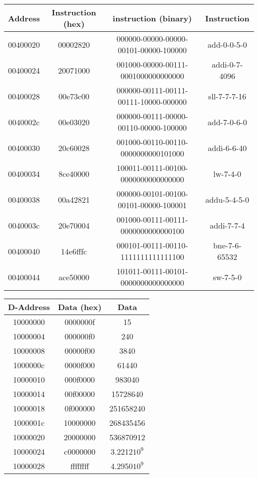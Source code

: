 \documentclass[11pt]{article}   	%
\begin{document}
\begin{table}[!htbp]

\begin{tabular}{|c|c|c|c|}
\hline
Address & Instruction (hex) & instruction (binary)  &  Instruction \\
\hline
00400020 & 00002820 & 000000-00000-00000-00101-00000-100000& add-0-0-5-0  \\
\hline
00400024 & 20071000 & 001000-00000-00111-0001000000000000 &addi-0-7-4096   \\
\hline
00400028 & 00e73c00 & 000000-00111-00111-00111-10000-000000 & sll-7-7-7-16  \\
\hline
0040002c & 00e03020 & 000000-00111-00000-00110-00000-100000 & add-7-0-6-0  \\
\hline
00400030 & 20c60028 & 001000-00110-00110-0000000000101000 & addi-6-6-40   \\
\hline
00400034 & 8ce40000 & 100011-00111-00100-0000000000000000 &lw-7-4-0    \\
\hline
00400038 & 00a42821 & 000000-00101-00100-00101-00000-100001 & addu-5-4-5-0 \\
\hline
0040003c & 20e70004 & 001000-00111-00111-0000000000000100 & addi-7-7-4   \\
\hline
00400040 & 14e6fffc & 000101-00111-00110-1111111111111100 &bne-7-6-65532    \\
\hline
00400044 & ace50000 & 101011-00111-00101-0000000000000000 & sw-7-5-0   \\
\hline
\end{tabular}
\end{table}

\begin{table}[!htbp]
\begin{tabular}{|c|c|c|}
\hline
D-Address & Data (hex) & Data \\
\hline
10000000 & 0000000f & 15   \\
\hline
10000004 & 000000f0 & 240  \\
\hline
10000008 & 00000f00 & 3840  \\
\hline
1000000c & 0000f000 & 61440   \\
\hline
10000010 & 000f0000&  983040 \\
\hline
10000014 & 00f00000 & 15728640 \\
\hline
10000018 & 0f000000 & 251658240   \\
\hline
1000001c & 10000000 & 268435456   \\
\hline
10000020 & 20000000 &  536870912   \\
\hline
10000024 & c0000000 & 3.2212$10^9 $ \\
\hline
10000028 & ffffffff & 4.2950$10^9$ \\
\hline

\end{tabular}
\end{table}
\end{document}
